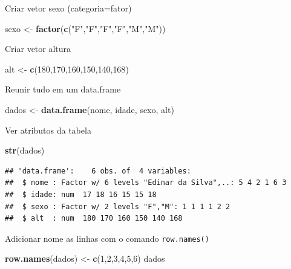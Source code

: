 \documentclass[]{book}
\newenvironment{Shaded}{\begin{snugshade}}{\end{snugshade}}
\newcommand{\DecValTok}[1]{\textcolor[rgb]{0.00,0.00,0.81}{#1}}
\newcommand{\KeywordTok}[1]{\textcolor[rgb]{0.13,0.29,0.53}{\textbf{#1}}}
\newcommand{\NormalTok}[1]{#1}
\newcommand{\StringTok}[1]{\textcolor[rgb]{0.31,0.60,0.02}{#1}}
\begin{document}
Criar vetor sexo (categoria=fator)

\begin{Shaded}
\begin{Highlighting}[]
\NormalTok{sexo <-}\StringTok{ }\KeywordTok{factor}\NormalTok{(}\KeywordTok{c}\NormalTok{(}\StringTok{"F"}\NormalTok{,}\StringTok{"F"}\NormalTok{,}\StringTok{"F"}\NormalTok{,}\StringTok{"F"}\NormalTok{,}\StringTok{"M"}\NormalTok{,}\StringTok{"M"}\NormalTok{))}
\end{Highlighting}
\end{Shaded}

Criar vetor altura

\begin{Shaded}
\begin{Highlighting}[]
\NormalTok{alt <-}\StringTok{ }\KeywordTok{c}\NormalTok{(}\DecValTok{180}\NormalTok{,}\DecValTok{170}\NormalTok{,}\DecValTok{160}\NormalTok{,}\DecValTok{150}\NormalTok{,}\DecValTok{140}\NormalTok{,}\DecValTok{168}\NormalTok{)}
\end{Highlighting}
\end{Shaded}

Reunir tudo em um data.frame

\begin{Shaded}
\begin{Highlighting}[]
\NormalTok{dados <-}\StringTok{ }\KeywordTok{data.frame}\NormalTok{(nome, idade, sexo, alt)}
\end{Highlighting}
\end{Shaded}

Ver atributos da tabela

\begin{Shaded}
\begin{Highlighting}[]
\KeywordTok{str}\NormalTok{(dados)}
\end{Highlighting}
\end{Shaded}

\begin{verbatim}
## 'data.frame':    6 obs. of  4 variables:
##  $ nome : Factor w/ 6 levels "Edinar da Silva",..: 5 4 2 1 6 3
##  $ idade: num  17 18 16 15 15 18
##  $ sexo : Factor w/ 2 levels "F","M": 1 1 1 1 2 2
##  $ alt  : num  180 170 160 150 140 168
\end{verbatim}

Adicionar nome as linhas com o comando \texttt{row.names()}

\begin{Shaded}
\begin{Highlighting}[]
\KeywordTok{row.names}\NormalTok{(dados) <-}\StringTok{ }\KeywordTok{c}\NormalTok{(}\DecValTok{1}\NormalTok{,}\DecValTok{2}\NormalTok{,}\DecValTok{3}\NormalTok{,}\DecValTok{4}\NormalTok{,}\DecValTok{5}\NormalTok{,}\DecValTok{6}\NormalTok{)}
\NormalTok{dados}
\end{Highlighting}
\end{Shaded}
\end{document}
